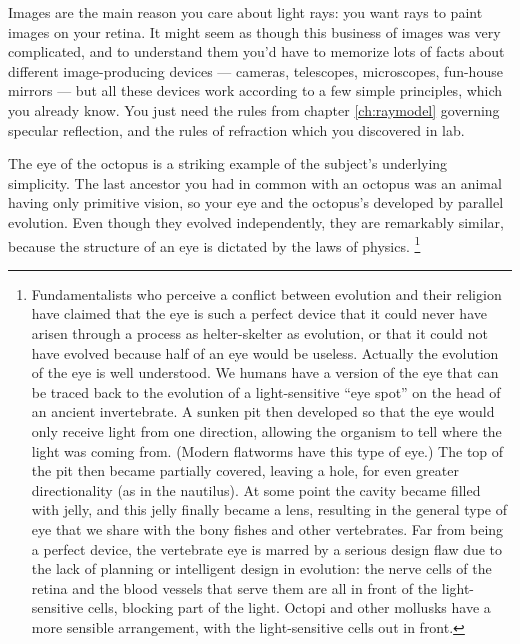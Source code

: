 \label{ch:images}

Images are the main reason you care about light rays:
you want rays to paint images on your retina. It might seem as though
this business of images was very complicated, and to understand them
you'd have to memorize lots of facts about different image-producing
devices --- cameras, telescopes, microscopes, fun-house mirrors ---
but all these devices work according to a few simple principles, which
you already know.
You just need the rules from chapter
\ref{ch:raymodel} governing specular
reflection, and the rules of refraction which you discovered in lab.

The eye of the octopus is a striking example of the subject's underlying simplicity.
The last ancestor you had in common with an octopus was
an animal having only primitive vision, so your eye and the octopus's developed by parallel
evolution. Even though they evolved independently, they are
remarkably similar, because the structure of an eye is
dictated by the laws of physics.%
\footnote{Fundamentalists who perceive a conflict between evolution
and their religion have claimed that the eye is such a
perfect device that it could never have arisen through a
process as helter-skelter as evolution, or that it could not
have evolved because half of an eye
would be useless. Actually the evolution of the eye is
well understood. We humans have
a version of the eye that can be traced back to the
evolution of a light-sensitive ``eye spot'' on the head of
an ancient invertebrate. A sunken pit then developed so that
the eye would only receive light from one direction,
allowing the organism to tell where the light was coming
from. (Modern flatworms have this type of
eye.) The top of the pit then became partially covered,
leaving a hole, for even greater directionality (as in the
nautilus). At some point the cavity became
filled with jelly, and this jelly finally became a lens,
resulting in the general type of eye that we share with the
bony fishes and other vertebrates. Far from being a perfect
device, the vertebrate eye is marred by a serious design
flaw due to the lack of planning or intelligent design in
evolution: the nerve cells of the retina and the blood
vessels that serve them are all in front of the light-sensitive
cells, blocking part of the light. Octopi and
other mollusks have a more sensible
arrangement, with the light-sensitive cells out in front.}


